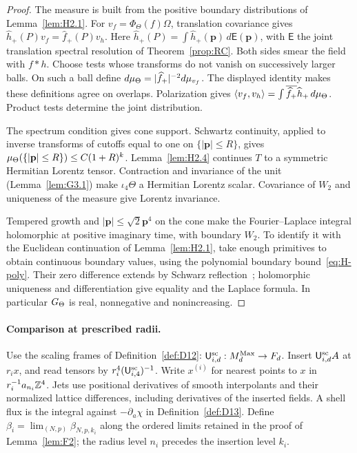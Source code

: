 \begin{proof}
The measure is built from the positive boundary distributions of Lemma~\ref{lem:H2.1}. For $v_f=\Phi_\Theta(f)\Omega$, translation covariance gives $\widehat h_+(P)v_f=\widehat f_+(P)v_h$.
Here $\widehat h_+(P)=\int\widehat h_+(\mathbf p)\,d\mathsf E(\mathbf p)$, with $\mathsf E$ the joint translation spectral resolution of Theorem~\ref{prop:RC}. Both sides smear the field with $f*h$. Choose tests whose transforms do not vanish on successively larger balls. On such a ball define $d\mu_{\Theta}=|\widehat f_+|^{-2}d\mu_{v_f}$. The displayed identity makes these definitions agree on overlaps. Polarization gives $\langle v_f,v_h\rangle=\int\overline{\widehat f_+}\widehat h_+\,d\mu_{\Theta}$. Product tests determine the joint distribution.

The spectrum condition gives cone support. Schwartz continuity, applied to inverse transforms of cutoffs equal to one on $\{|\mathbf p|\le R\}$, gives $\mu_{\Theta}(\{|\mathbf p|\le R\})\le C(1+R)^k$. Lemma~\ref{lem:H2.4} continues $T$ to a symmetric Hermitian Lorentz tensor. Contraction and invariance of the unit (Lemma~\ref{lem:G3.1}) make $\iota_4\Theta$ a Hermitian Lorentz scalar. Covariance of $W_2$ and uniqueness of the measure give Lorentz invariance.

Tempered growth and $|\mathbf p|\le\sqrt2\mathbf p^4$ on the cone make the Fourier--Laplace integral holomorphic at positive imaginary time, with boundary $W_2$. To identify it with the Euclidean continuation of Lemma~\ref{lem:H2.1}, take enough primitives to obtain continuous boundary values, using the polynomial boundary bound~\eqref{eq:H-poly}. Their zero difference extends by Schwarz reflection~\cite[Theorem~11.14]{Rudin1987}; holomorphic uniqueness and differentiation give equality and the Laplace formula. In particular $G_{\Theta}$ is real, nonnegative and nonincreasing.
\end{proof}

\paragraph{Comparison at prescribed radii.}
Use the scaling frames of Definition~\ref{def:D12}: $\mathsf{U}_{i,d}^{\mathrm{sc}}:M_{d}^{\mathrm{Max}}\to F_d$. Insert $\mathsf{U}_{i,d}^{\mathrm{sc}}A$ at $r_ix$, and read tensors by $r_i^4(\mathsf{U}_{i,4}^{\mathrm{sc}})^{-1}$. Write $x^{(i)}$ for nearest points to $x$ in $r_i^{-1}a_{n_i}\mathbb{Z}^4$. Jets use positional derivatives of smooth interpolants and their normalized lattice differences, including derivatives of the inserted fields. A shell flux is the integral against $-\partial_a\chi$ in Definition~\ref{def:D13}. Define $\beta_i=\lim_{(N,p)}\beta_{N,p,k_i}$ along the ordered limits retained in the proof of Lemma~\ref{lem:F2}; the radius level $n_i$ precedes the insertion level $k_i$.

